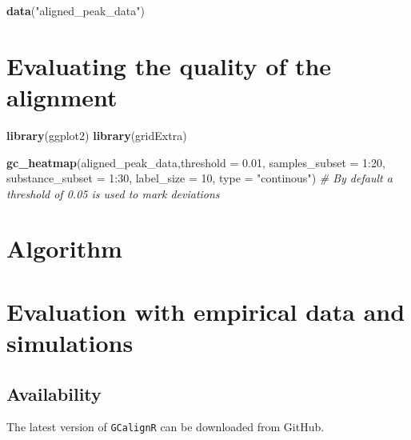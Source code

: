 \documentclass[]{article}
\newenvironment{Shaded}{}{}
\newcommand{\KeywordTok}[1]{\textbf{{#1}}}
\newcommand{\DataTypeTok}[1]{\textcolor[rgb]{0.50,0.00,0.00}{{#1}}}
\newcommand{\DecValTok}[1]{\textcolor[rgb]{0.00,0.00,1.00}{{#1}}}
\newcommand{\FloatTok}[1]{\textcolor[rgb]{0.50,0.00,0.50}{{#1}}}
\newcommand{\StringTok}[1]{\textcolor[rgb]{0.87,0.00,0.00}{{#1}}}
\newcommand{\CommentTok}[1]{\textcolor[rgb]{0.50,0.50,0.50}{\textit{{#1}}}}
\newcommand{\NormalTok}[1]{{#1}}
\begin{document}
\begin{Shaded}
\begin{Highlighting}[]
\KeywordTok{data}\NormalTok{(}\StringTok{"aligned_peak_data"}\NormalTok{)}
\end{Highlighting}
\end{Shaded}

\section{Evaluating the quality of the
alignment}\label{evaluating-the-quality-of-the-alignment}

\begin{Shaded}
\begin{Highlighting}[]
\KeywordTok{library}\NormalTok{(ggplot2)}
\KeywordTok{library}\NormalTok{(gridExtra)}
\end{Highlighting}
\end{Shaded}

\begin{Shaded}
\begin{Highlighting}[]
\KeywordTok{gc_heatmap}\NormalTok{(aligned_peak_data,}\DataTypeTok{threshold =} \FloatTok{0.01}\NormalTok{, }\DataTypeTok{samples_subset =} \DecValTok{1}\NormalTok{:}\DecValTok{20}\NormalTok{, }\DataTypeTok{substance_subset =} \DecValTok{1}\NormalTok{:}\DecValTok{30}\NormalTok{, }\DataTypeTok{label_size =} \DecValTok{10}\NormalTok{, }\DataTypeTok{type =} \StringTok{"continous"}\NormalTok{) }\CommentTok{# By default a threshold of 0.05 is used to mark deviations}
\end{Highlighting}
\end{Shaded}

\section{Algorithm}\label{algorithm}

\section{Evaluation with empirical data and
simulations}\label{evaluation-with-empirical-data-and-simulations}

\subsection{Availability}\label{availability}

The latest version of \texttt{GCalignR} can be downloaded from GitHub.
\end{document}
